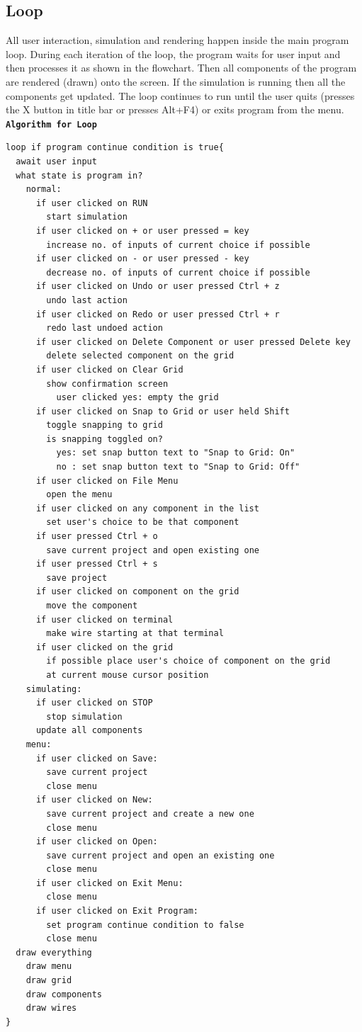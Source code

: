 \documentclass[report]{subfiles}
\begin{document}
    \subsection{Loop}
    All user interaction, simulation and rendering happen inside the main program loop. During each iteration of the loop, the program waits for user input and then processes it as shown in the flowchart. Then all components of the program are rendered (drawn) onto the screen. If the simulation is running then all the components get updated. The loop continues to run until the user quits (presses the X button in title bar or presses Alt+F4) or exits program from the menu.\\
        \textbf{\texttt{Algorithm for Loop}}
        \begin{verbatim}
loop if program continue condition is true{
  await user input
  what state is program in?
    normal:
      if user clicked on RUN
        start simulation
      if user clicked on + or user pressed = key
        increase no. of inputs of current choice if possible
      if user clicked on - or user pressed - key
        decrease no. of inputs of current choice if possible
      if user clicked on Undo or user pressed Ctrl + z
        undo last action
      if user clicked on Redo or user pressed Ctrl + r
        redo last undoed action
      if user clicked on Delete Component or user pressed Delete key
        delete selected component on the grid
      if user clicked on Clear Grid
        show confirmation screen
          user clicked yes: empty the grid
      if user clicked on Snap to Grid or user held Shift
        toggle snapping to grid
        is snapping toggled on?
          yes: set snap button text to "Snap to Grid: On"
          no : set snap button text to "Snap to Grid: Off"
      if user clicked on File Menu
        open the menu
      if user clicked on any component in the list
        set user's choice to be that component
      if user pressed Ctrl + o
        save current project and open existing one
      if user pressed Ctrl + s
        save project
      if user clicked on component on the grid
        move the component
      if user clicked on terminal
        make wire starting at that terminal
      if user clicked on the grid
        if possible place user's choice of component on the grid
        at current mouse cursor position
    simulating:
      if user clicked on STOP
        stop simulation
      update all components
    menu:
      if user clicked on Save:
        save current project
        close menu
      if user clicked on New:
        save current project and create a new one
        close menu
      if user clicked on Open:
        save current project and open an existing one
        close menu
      if user clicked on Exit Menu:
        close menu
      if user clicked on Exit Program:
        set program continue condition to false 
        close menu
  draw everything
    draw menu
    draw grid
    draw components
    draw wires
}
        \end{verbatim}
\end{document}

